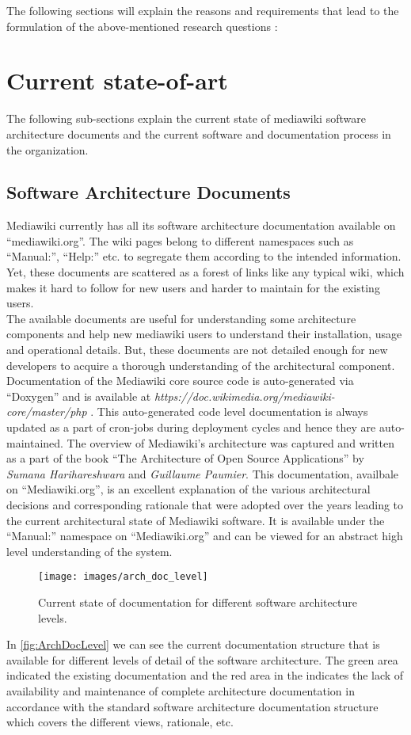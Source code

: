 The following sections will explain the reasons and requirements that lead to the formulation of the above-mentioned research questions : 
 
\section{Current state-of-art}\label{CurrentSOA} 
\indent The following sub-sections explain the current state of mediawiki software architecture documents and the current software and documentation process in the organization.
\subsection{Software Architecture Documents}
\indent Mediawiki currently has all its software architecture documentation available on \enquote{mediawiki.org}. The wiki pages belong to different namespaces such as \enquote{Manual:}, \enquote{Help:} etc. to segregate them according to the intended information. Yet, these documents are scattered as a forest of links like any typical wiki, which makes it hard to follow for new users and harder to maintain for the existing users. 
\\\indent The available documents are useful for understanding some architecture components and help new mediawiki users to understand their installation, usage and operational details. But, these documents are not detailed enough for new developers to acquire a thorough understanding of the architectural component.  Documentation of the Mediawiki core source code is auto-generated via \enquote{Doxygen} and is available at \emph{https://doc.wikimedia.org/mediawiki-core/master/php }. This auto-generated code level documentation is always updated as a part of cron-jobs during deployment cycles and hence they are auto-maintained. The overview of Mediawiki's architecture was captured and written as a part of the book \enquote{The Architecture of Open Source Applications} by \emph{Sumana Harihareshwara} and \emph{Guillaume Paumier}. This documentation, availbale on \enquote{Mediawiki.org}, is an excellent explanation of the various architectural decisions and corresponding rationale that were adopted over the years leading to the current architectural state  of Mediawiki software. It is available under the \enquote{Manual:} namespace on \enquote{Mediawiki.org} and can be viewed for an abstract high level understanding of the system.
\begin{figure}[H]
  \centering
  \texttt{[image: images/arch\_doc\_level]}
  \caption[Documentation available for software architecture levels]{Current state of documentation for different software architecture levels.}\label{fig:ArchDocLevel}
\end{figure}
\indent In \autoref{fig:ArchDocLevel}  we can see the current documentation structure that is available for different levels of detail of the software architecture. The green area indicated the existing documentation and the red area in the indicates the lack of availability and maintenance of complete architecture documentation in accordance with the standard software architecture documentation structure \cite{BachmannDocumentingSoftware2010} which covers the different views, rationale,  etc.
